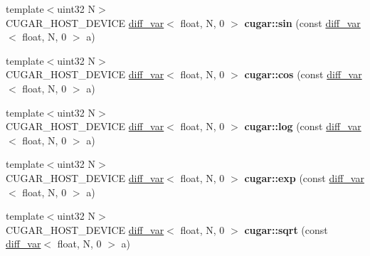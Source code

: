 \begin{DoxyCompactItemize}
\item 
\mbox{\label{group___auto_diff_module_ga06758f828c79b2f7dd10ae6f31490478}} 
{\footnotesize template$<$uint32 N$>$ }\\C\+U\+G\+A\+R\+\_\+\+H\+O\+S\+T\+\_\+\+D\+E\+V\+I\+CE \hyperlink{structcugar_1_1diff__var}{diff\+\_\+var}$<$ float, N, 0 $>$ {\bfseries cugar\+::sin} (const \hyperlink{structcugar_1_1diff__var}{diff\+\_\+var}$<$ float, N, 0 $>$ a)
\item 
\mbox{\label{group___auto_diff_module_gab8a009d6fa1af8a20dc1ad3172af0f89}} 
{\footnotesize template$<$uint32 N$>$ }\\C\+U\+G\+A\+R\+\_\+\+H\+O\+S\+T\+\_\+\+D\+E\+V\+I\+CE \hyperlink{structcugar_1_1diff__var}{diff\+\_\+var}$<$ float, N, 0 $>$ {\bfseries cugar\+::cos} (const \hyperlink{structcugar_1_1diff__var}{diff\+\_\+var}$<$ float, N, 0 $>$ a)
\item 
\mbox{\label{group___auto_diff_module_gaac3122b61f90da0bfac230c08a3fcd85}} 
{\footnotesize template$<$uint32 N$>$ }\\C\+U\+G\+A\+R\+\_\+\+H\+O\+S\+T\+\_\+\+D\+E\+V\+I\+CE \hyperlink{structcugar_1_1diff__var}{diff\+\_\+var}$<$ float, N, 0 $>$ {\bfseries cugar\+::log} (const \hyperlink{structcugar_1_1diff__var}{diff\+\_\+var}$<$ float, N, 0 $>$ a)
\item 
\mbox{\label{group___auto_diff_module_ga5af44a2105b02ee32dcfb851ba4e5d56}} 
{\footnotesize template$<$uint32 N$>$ }\\C\+U\+G\+A\+R\+\_\+\+H\+O\+S\+T\+\_\+\+D\+E\+V\+I\+CE \hyperlink{structcugar_1_1diff__var}{diff\+\_\+var}$<$ float, N, 0 $>$ {\bfseries cugar\+::exp} (const \hyperlink{structcugar_1_1diff__var}{diff\+\_\+var}$<$ float, N, 0 $>$ a)
\item 
\mbox{\label{group___auto_diff_module_gaa771282395ac866de2e6de6fdec3d42d}} 
{\footnotesize template$<$uint32 N$>$ }\\C\+U\+G\+A\+R\+\_\+\+H\+O\+S\+T\+\_\+\+D\+E\+V\+I\+CE \hyperlink{structcugar_1_1diff__var}{diff\+\_\+var}$<$ float, N, 0 $>$ {\bfseries cugar\+::sqrt} (const \hyperlink{structcugar_1_1diff__var}{diff\+\_\+var}$<$ float, N, 0 $>$ a)
\item 
\mbox{\label{group___auto_diff_module_ga68769eb7dc843befe4a04e8379c438c2}} 

\end{DoxyCompactItemize}
